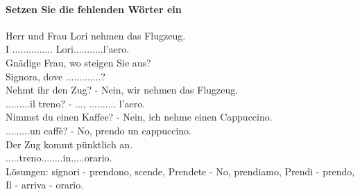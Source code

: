 \documentclass{article}
\begin{document}
\paragraph{Setzen Sie die fehlenden Wörter ein}
Herr und Frau Lori nehmen das Flugzeug.\\
I ............... Lori...........l'aero.\\
Gnädige Frau, wo steigen Sie aus?\\
Signora, dove .............?\\
Nehmt ihr den Zug? - Nein, wir nehmen das Flugzeug.\\
.........il treno? - ..., .......... l'aero.\\
Nimmst du einen Kaffee? - Nein, ich nehme einen Cappuccino.\\
.........un caffè? - No, prendo un cappuccino.\\
Der Zug kommt pünktlich an.\\
.....treno........in.....orario.\\

Lösungen: signori - prendono, scende, Prendete - No, prendiamo, Prendi -
prendo, Il - arriva - orario.
\end{document}
